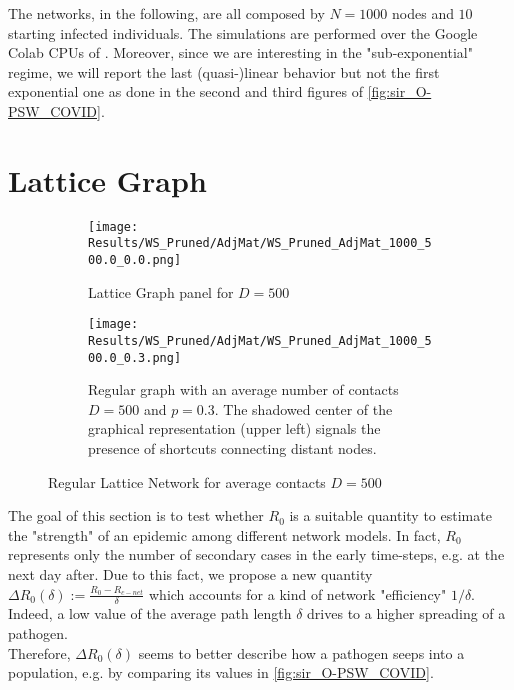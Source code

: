 \documentclass[a4paper,10pt,twoside]{book} %
\theoremstyle{definition}
\begin{document}
The networks, in the following, are all composed by $N = 1000$ nodes and $10$ starting infected individuals. The simulations are performed over the Google Colab CPUs of \cite{GoogleColab}.
Moreover, since we are interesting in the "sub-exponential" regime, we will report the last (quasi-)linear behavior but not the first exponential one as done in the second and third figures of \autoref{fig:sir_O-PSW_COVID}.

\section{Lattice Graph}
\begin{figure}[H]
	\begin{subfigure}[t]{0.48\linewidth}
		\centering
		\texttt{[image: Results/WS\_Pruned/AdjMat/WS\_Pruned\_AdjMat\_1000\_500.0\_0.0.png]}
		\caption{Lattice Graph panel for $D = 500$} 
		\label{fig:net_RegLat_D500}
	\end{subfigure} 
	\hfill
	\begin{subfigure}[t]{0.48\linewidth}
		\centering
		\texttt{[image: Results/WS\_Pruned/AdjMat/WS\_Pruned\_AdjMat\_1000\_500.0\_0.3.png]}
		\caption{Regular graph with an average number of contacts $D = 500$ and $p = 0.3$.
		The shadowed center of the graphical representation (upper left) signals the presence of shortcuts connecting distant nodes.}
		\label{fig:net_RegLat_D500_p0.3}
	\end{subfigure}
	\caption{Regular Lattice Network for average contacts $ D = 500$ }
	\label{fig:net_RegLat}
\end{figure}
The goal of this section is to test whether $R_0$ is a suitable quantity to estimate the "strength" of an epidemic among different network models. In fact, $R_0$ represents only the number of secondary cases in the early time-steps, e.g. at the next day after. 
Due to this fact, we propose a new quantity $\Delta R_0(\delta):= \frac{R_0 - R_{c-net}}{\delta}$ which accounts for a kind of network "efficiency" $1/\delta$. Indeed, a low value of the average path length $ \delta$  drives to a higher spreading of a pathogen. 
\\Therefore, $\Delta R_0(\delta)$ seems to better describe how a pathogen seeps into a population, e.g. by comparing its values in \autoref{fig:sir_O-PSW_COVID}.
\end{document}
